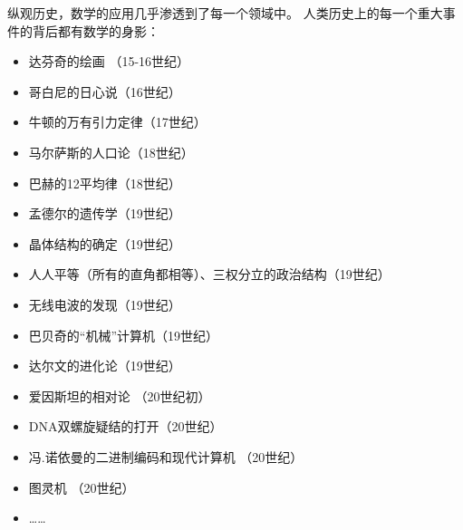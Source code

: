 纵观历史，数学的应用几乎渗透到了每一个领域中。
人类历史上的每一个重大事件的背后都有数学的身影：
\begin{itemize}
\item 达芬奇的绘画 （15-16世纪）
\item 哥白尼的日心说（16世纪）
\item 牛顿的万有引力定律（17世纪）
\item 马尔萨斯的人口论（18世纪）
\item 巴赫的12平均律（18世纪）
\item 孟德尔的遗传学（19世纪）
\item 晶体结构的确定（19世纪）
\item 人人平等（所有的直角都相等）、三权分立的政治结构（19世纪）
\item 无线电波的发现（19世纪）
\item 巴贝奇的“机械”计算机（19世纪）
\item 达尔文的进化论（19世纪）
\item 爱因斯坦的相对论 （20世纪初）
\item DNA双螺旋疑结的打开（20世纪）
\item 冯.诺依曼的二进制编码和现代计算机 （20世纪）
\item 图灵机 （20世纪）
\item ……
\end{itemize}


\newpage
